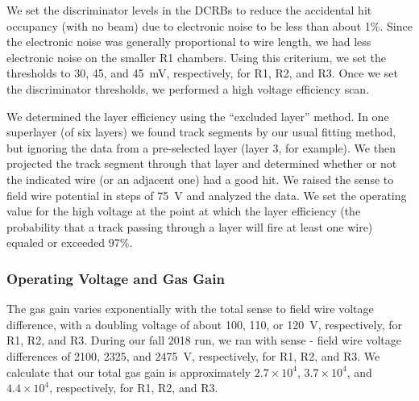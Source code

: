 We set the discriminator levels in the DCRBs to reduce the accidental hit occupancy (with no beam) due to
electronic noise to be less than about 1\%.  Since the electronic noise was generally proportional to wire length,
we had less electronic noise on the smaller R1 chambers.  Using this criterium, we set the thresholds to 30, 45,
and 45~mV, respectively, for R1, R2, and R3.  
Once we set the discriminator thresholds, we performed a high voltage efficiency scan.  

We determined the layer efficiency using the ``excluded layer'' method.  In one superlayer (of six layers) we
found track segments by our usual fitting method, but ignoring the data from a pre-selected layer (layer 3, for
example).  We then projected the track segment through that layer and determined whether or not the indicated
wire (or an adjacent one) had a good hit.
We raised the sense to field wire potential in
steps of 75~V and analyzed the data.  We set the operating value for the high voltage at the point at which
the layer efficiency (the probability that a track passing through a layer will fire at least one wire) equaled or
exceeded 97\%.



\subsubsection{Operating Voltage and Gas Gain}
\label{operating-voltage}

The gas gain varies exponentially with the total sense to field wire voltage
difference, with a doubling voltage of about 100, 110, or 120~V, respectively, for
R1, R2, and R3.  During our fall 2018 run, we ran with sense - field wire voltage
differences of 2100, 2325, and 2475~V, respectively, for R1, R2, and R3.
We calculate that our total gas gain is approximately 
$2.7 \times 10^4$, $3.7 \times 10^4$, and $4.4 \times 10^4$,  
respectively, for R1, R2, and R3.

